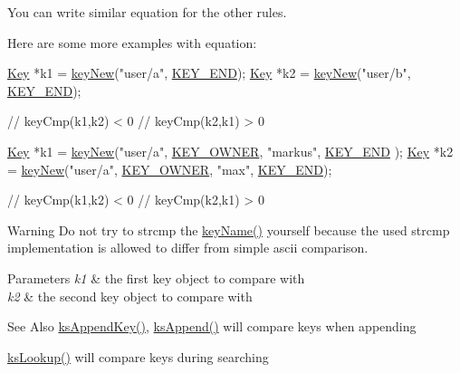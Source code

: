 You can write similar equation for the other rules.

Here are some more examples with equation\-: 
\begin{DoxyCode}
\hyperlink{classkdb_1_1Key_a5679f5cae63caddd64a60388b9cc77fa}{Key} *k1 = \hyperlink{group__key_gaf6893c038b3ebee90c73a9ea8356bebf}{keyNew}(\textcolor{stringliteral}{"user/a"}, \hyperlink{group__key_gga91fb3178848bd682000958089abbaf40aa8adb6fcb92dec58fb19410eacfdd403}{KEY\_END});
\hyperlink{classkdb_1_1Key_a5679f5cae63caddd64a60388b9cc77fa}{Key} *k2 = \hyperlink{group__key_gaf6893c038b3ebee90c73a9ea8356bebf}{keyNew}(\textcolor{stringliteral}{"user/b"}, \hyperlink{group__key_gga91fb3178848bd682000958089abbaf40aa8adb6fcb92dec58fb19410eacfdd403}{KEY\_END});

\textcolor{comment}{// keyCmp(k1,k2) < 0}
\textcolor{comment}{// keyCmp(k2,k1) > 0}
\end{DoxyCode}



\begin{DoxyCode}
\hyperlink{classkdb_1_1Key_a5679f5cae63caddd64a60388b9cc77fa}{Key} *k1 = \hyperlink{group__key_gaf6893c038b3ebee90c73a9ea8356bebf}{keyNew}(\textcolor{stringliteral}{"user/a"}, \hyperlink{group__key_gga91fb3178848bd682000958089abbaf40a77ca60362fa8daca8d5347db4385068b}{KEY\_OWNER}, \textcolor{stringliteral}{"markus"}, \hyperlink{group__key_gga91fb3178848bd682000958089abbaf40aa8adb6fcb92dec58fb19410eacfdd403}{KEY\_END}
      );
\hyperlink{classkdb_1_1Key_a5679f5cae63caddd64a60388b9cc77fa}{Key} *k2 = \hyperlink{group__key_gaf6893c038b3ebee90c73a9ea8356bebf}{keyNew}(\textcolor{stringliteral}{"user/a"}, \hyperlink{group__key_gga91fb3178848bd682000958089abbaf40a77ca60362fa8daca8d5347db4385068b}{KEY\_OWNER}, \textcolor{stringliteral}{"max"}, \hyperlink{group__key_gga91fb3178848bd682000958089abbaf40aa8adb6fcb92dec58fb19410eacfdd403}{KEY\_END});

\textcolor{comment}{// keyCmp(k1,k2) < 0}
\textcolor{comment}{// keyCmp(k2,k1) > 0}
\end{DoxyCode}


\begin{DoxyWarning}{Warning}
Do not try to strcmp the \hyperlink{group__keyname_ga8e805c726a60da921d3736cda7813513}{key\-Name()} yourself because the used strcmp implementation is allowed to differ from simple ascii comparison.
\end{DoxyWarning}

\begin{DoxyParams}{Parameters}
{\em k1} & the first key object to compare with \\
\hline
{\em k2} & the second key object to compare with\\
\hline
\end{DoxyParams}
\begin{DoxySeeAlso}{See Also}
\hyperlink{group__keyset_gaa5a1d467a4d71041edce68ea7748ce45}{ks\-Append\-Key()}, \hyperlink{group__keyset_ga21eb9c3a14a604ee3a8bdc779232e7b7}{ks\-Append()} will compare keys when appending 

\hyperlink{group__keyset_gaa34fc43a081e6b01e4120daa6c112004}{ks\-Lookup()} will compare keys during searching 
\end{DoxySeeAlso}



